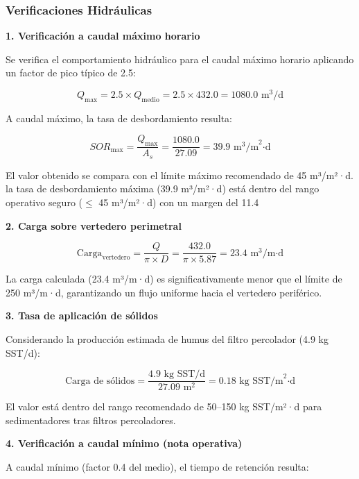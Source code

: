 \documentclass[12pt,a4paper]{article}
\begin{document}
\subsubsection{Verificaciones Hidráulicas}

\textbf{1. Verificación a caudal máximo horario}

Se verifica el comportamiento hidráulico para el caudal máximo horario aplicando un factor de pico típico de 2.5:

\begin{equation}
Q_{\max} = 2.5 \times Q_{\text{medio}} = 2.5 \times 432.0 = 1080.0 \text{ m}^3\text{/d}
\end{equation}

A caudal máximo, la tasa de desbordamiento resulta:

\begin{equation}
SOR_{\max} = \frac{Q_{\max}}{A_s} = \frac{1080.0}{27.09} = 39.9 \text{ m}^3\text{/m}^2\text{·d}
\end{equation}

El valor obtenido se compara con el límite máximo recomendado de 45 m³/m²·d. la tasa de desbordamiento máxima (39.9 m³/m²·d) está dentro del rango operativo seguro ($\leq$ 45 m³/m²·d) con un margen del 11.4%

\textbf{2. Carga sobre vertedero perimetral}

\begin{equation}
\text{Carga}_{\text{vertedero}} = \frac{Q}{\pi \times D} = \frac{432.0}{\pi \times 5.87} = 23.4 \text{ m}^3\text{/m·d}
\end{equation}

La carga calculada (23.4 m³/m·d) es significativamente menor que el límite de 250 m³/m·d, garantizando un flujo uniforme hacia el vertedero periférico.

\textbf{3. Tasa de aplicación de sólidos}

Considerando la producción estimada de humus del filtro percolador (4.9 kg SST/d):

\begin{equation}
\text{Carga de sólidos} = \frac{4.9 \text{ kg SST/d}}{27.09 \text{ m}^2} = 0.18 \text{ kg SST/m}^2\text{·d}
\end{equation}

El valor está dentro del rango recomendado de 50--150 kg SST/m²·d para sedimentadores tras filtros percoladores.

\textbf{4. Verificación a caudal mínimo (nota operativa)}

A caudal mínimo (factor 0.4 del medio), el tiempo de retención resulta:
\end{document}
